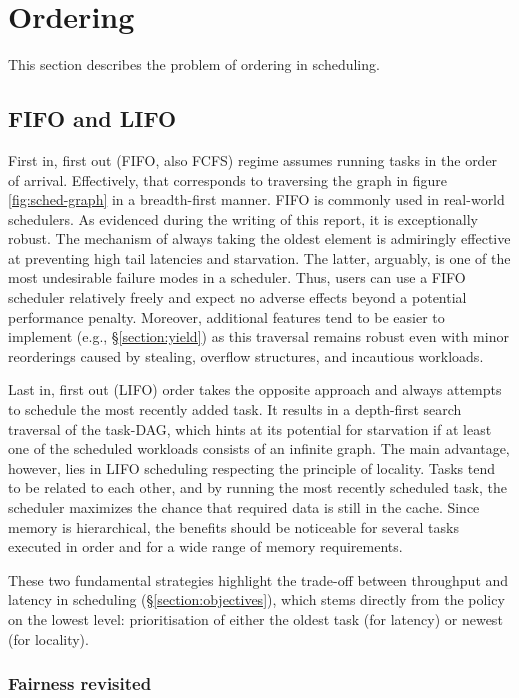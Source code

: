 \documentclass[12pt,a4paper,twoside]{report}
\begin{document}
\section{Ordering}
\label{section:approaches}
This section describes the problem of ordering in scheduling.

\subsection{FIFO and LIFO}
\label{section:ordering}
First in, first out (FIFO, also FCFS) regime assumes running tasks in the order of arrival. Effectively, that corresponds to traversing the graph in figure \ref{fig:sched-graph} in a breadth-first manner. FIFO is commonly used in real-world schedulers. As evidenced during the writing of this report, it is exceptionally robust. The mechanism of always taking the oldest element is admiringly effective at preventing high tail latencies and starvation. The latter, arguably, is one of the most undesirable failure modes in a scheduler. Thus, users can use a FIFO scheduler relatively freely and expect no adverse effects beyond a potential performance penalty. Moreover, additional features tend to be easier to implement (e.g., \S\ref{section:yield}) as this traversal remains robust even with minor reorderings caused by stealing, overflow structures, and incautious workloads.

Last in, first out (LIFO) order takes the opposite approach and always attempts to schedule the most recently added task. It results in a depth-first search traversal of the task-DAG, which hints at its potential for starvation if at least one of the scheduled workloads consists of an infinite graph. The main advantage, however, lies in LIFO scheduling respecting the principle of locality. Tasks tend to be related to each other, and by running the most recently scheduled task, the scheduler maximizes the chance that required data is still in the cache. Since memory is hierarchical, the benefits should be noticeable for several tasks executed in order and for a wide range of memory requirements. 

These two fundamental strategies highlight the trade-off between throughput and latency in scheduling (\S\ref{section:objectives}), which stems directly from the policy on the lowest level: prioritisation of either the oldest task (for latency) or newest (for locality).


\subsubsection{Fairness revisited}
\label{section:fairness-revisited}
\end{document}
